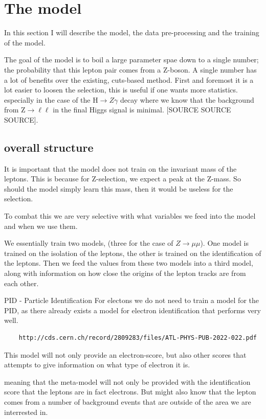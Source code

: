 \documentclass{tufte-book}
\begin{document}
\section{The model}

In this section I will describe the model, the data pre-processing and the training of the model.

The goal of the model is to boil a large parameter spae down to a single number; the probability that this lepton pair comes from a Z-boson.
A single number has a lot of benefits over the existing, cuts-based method. First and foremost it is a lot easier to loosen the selection,
this is useful if one wants more statistics. especially in the case of the H\(\to Z\gamma\) decay where we know that the background from 
Z\(\to\ell\ell\) in the final Higgs signal is minimal. [SOURCE SOURCE SOURCE].





\subsection{overall structure}

It is important that the model does not train on the invariant mass of the leptons. This is because for Z-selection, we expect a peak at the Z-mass.
So should the model simply learn this mass, then it would be useless for the selection.

To combat this we are very selective with what variables we feed into the model and when we use them.

We essentially train two models, (three for the case of \(Z\to\mu\mu\)).
One model is trained on the isolation of the leptons, the other is trained on the identification of the leptons.
Then we feed the values from these two models into a third model, along with information on how close the origins of the lepton tracks are from each other.


PID - Particle Identification
For electons we do not need to train a model for the PID, as there already exists a model for electron identification that performs very well.
\begin{verbatim}
    http://cds.cern.ch/record/2809283/files/ATL-PHYS-PUB-2022-022.pdf
\end{verbatim}

This model will not only provide an electron-score, but also other scores that attempts to give information on what type of electron it is.

meaning that the meta-model will not only be provided with the identification score that the leptons are in fact electrons. 
But might also know that the lepton comes from a number of background events that are outside of the area we are interrested in.
\end{document}
